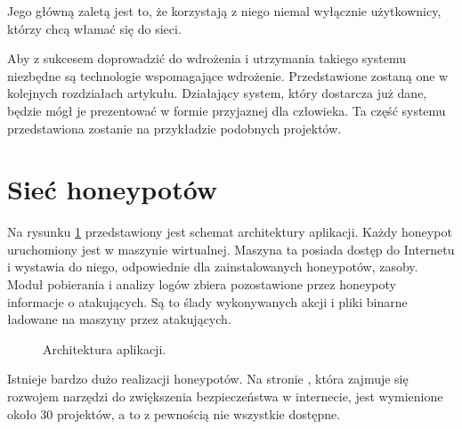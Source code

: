 \documentclass[runningheads,a4paper]{llncs}
\begin{document}
Jego główną zaletą jest to, że korzystają z niego niemal wyłącznie użytkownicy, którzy chcą włamać się do sieci.

Aby z sukcesem doprowadzić do wdrożenia i utrzymania takiego systemu niezbędne są technologie wspomagające wdrożenie. Przedstawione zostaną one w kolejnych rozdziałach artykułu. Działający system, który dostarcza już dane, będzie mógł je prezentować w formie przyjaznej dla człowieka. Ta część systemu przedstawiona zostanie na przykładzie podobnych projektów.

\section{Sieć honeypotów}

Na rysunku \ref{fig:architektura_fig} przedstawiony jest schemat architektury aplikacji. Każdy honeypot uruchomiony jest w maszynie wirtualnej. Maszyna ta posiada dostęp do Internetu i wystawia do niego, odpowiednie dla zainstalowanych honeypotów, zasoby. Moduł pobierania i analizy logów zbiera pozostawione przez honeypoty informacje o atakujących. Są to ślady wykonywanych akcji i pliki binarne ładowane na maszyny przez atakujących.

\begin{figure}
        \centering
        \caption{Architektura aplikacji.}
        \label{fig:architektura_fig}
\end{figure}

Istnieje bardzo dużo realizacji honeypotów. Na stronie \cite{honeynet_project}, która zajmuje się rozwojem narzędzi do zwiększenia bezpieczeństwa w internecie, jest wymienione około 30 projektów, a to z pewnością nie wszystkie dostępne.
\end{document}
